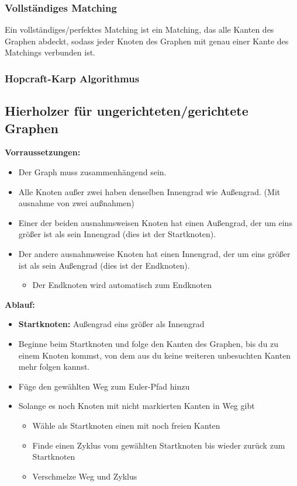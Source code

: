 \subsubsection*{Vollständiges Matching}

Ein vollständiges/perfektes Matching ist ein Matching, das alle Kanten des Graphen abdeckt, sodass jeder Knoten des Graphen mit genau einer Kante des Matchings verbunden ist.

\subsubsection*{Hopcraft-Karp Algorithmus}



\newpage

\subsection{Hierholzer für ungerichteten/gerichtete Graphen}

\textbf{Vorraussetzungen:}

\begin{itemize}
\item Der Graph muss zusammenhängend sein.
\item Alle Knoten außer zwei haben denselben Innengrad wie Außengrad. (Mit ausnahme von zwei außnahmen)
\item Einer der beiden ausnahmsweisen Knoten hat einen Außengrad, der um eins größer ist als sein Innengrad (dies ist der Startknoten).
\item Der andere ausnahmsweise Knoten hat einen Innengrad, der um eins größer ist als sein Außengrad (dies ist der Endknoten).
\begin{itemize}
\item Der Endknoten wird automatisch zum Endknoten
\end{itemize}
\end{itemize}

\textbf{Ablauf:}

\begin{itemize}
\item \textbf{Startknoten:} Außengrad eins größer als Innengrad
\item Beginne beim Startknoten und folge den Kanten des Graphen, bis du zu einem Knoten kommst, von dem aus du keine weiteren unbesuchten Kanten mehr folgen kannst.
\item Füge den gewählten Weg zum Euler-Pfad hinzu
\item Solange es noch Knoten mit nicht markierten Kanten in Weg gibt
\begin{itemize}
\item Wähle als Startknoten einen mit noch freien Kanten
\item Finde einen Zyklus vom gewählten Startknoten bis wieder zurück zum Startknoten
\item Verschmelze Weg und Zyklus
\end{itemize}
\end{itemize}
